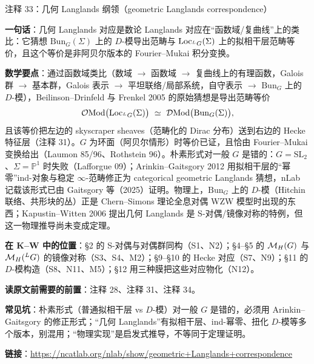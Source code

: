 \begin{kcard}{注释 33：几何 Langlands 纲领（geometric Langlands correspondence）}

\textbf{一句话}：几何 Langlands 对应是数论 Langlands 对应在“函数域/复曲线”上的类比：它猜想 $\mathrm{Bun}_G(\Sigma)$ 上的 $D$-模导出范畴与 $\mathrm{Loc}_{{}^{L}G}(\Sigma)$ 上的拟相干层范畴等价，且这个等价是非阿贝尔版本的 Fourier--Mukai 积分变换。

\textbf{数学要点}：通过函数域类比（数域 $\to$ 函数域 $\to$ 复曲线上的有理函数，Galois 群 $\to$ 基本群，Galois 表示 $\to$ 平坦联络/局部系统，自守表示 $\to$ $\mathrm{Bun}_G$ 上的 $D$-模），Beilinson--Drinfeld 与 Frenkel 2005 的原始猜想是导出范畴等价
\[
\mathcal O\mathrm{Mod}\big(\mathrm{Loc}_{{}^{L}G}(\Sigma)\big)\ \simeq\ \mathcal D\mathrm{Mod}\big(\mathrm{Bun}_G(\Sigma)\big),
\]
且该等价把左边的 skyscraper sheaves（范畴化的 Dirac 分布）送到右边的 Hecke 特征层（注释 31）。$G$ 为环面（阿贝尔情形）时等价已证，且恰由 Fourier--Mukai 变换给出（Laumon 85/96、Rothstein 96）。朴素形式对一般 $G$ 是错的：$G=\mathrm{SL}_2$、$\Sigma=\mathbb P^1$ 时失败（Lafforgue 09）；Arinkin--Gaitsgory 2012 用拟相干层的“幂零”ind-对象与稳定 $\infty$-范畴修正为 categorical geometric Langlands 猜想，nLab 记载该形式已由 Gaitsgory 等（2025）证明。物理上，$\mathrm{Bun}_G$ 上的 $D$-模（Hitchin 联络、共形块的丛）正是 Chern--Simons 理论全息对偶 WZW 模型时出现的东西；Kapustin--Witten 2006 提出几何 Langlands 是 S-对偶/镜像对称的特例，但这一物理推导尚未变成定理。

\textbf{在 K--W 中的位置}：§2 的 S-对偶与对偶群同构（S1、N2）；§4--§5 的 $\mathcal{M}_H(G)$ 与 $\mathcal{M}_H({}^{L}G)$ 的镜像对称（S3、S4、M2）；§9--§10 的 Hecke 对应（S7、N9）；§11 的 $D$-模构造（S8、N11、M5）；§12 用三种膜把这些对应物化（N12）。

\textbf{读原文前需要的前置}：注释 28、注释 31、注释 34。

\textbf{常见坑}：朴素形式（普通拟相干层 vs $D$-模）对一般 $G$ 是错的，必须用 Arinkin--Gaitsgory 的修正形式；“几何 Langlands”有拟相干层、ind-幂零、扭化 $D$-模等多个版本，别混用；“物理实现”是启发式推导，不等同于定理证明。

\noindent\textbf{链接}：\url{https://ncatlab.org/nlab/show/geometric+Langlands+correspondence}
\end{kcard}

